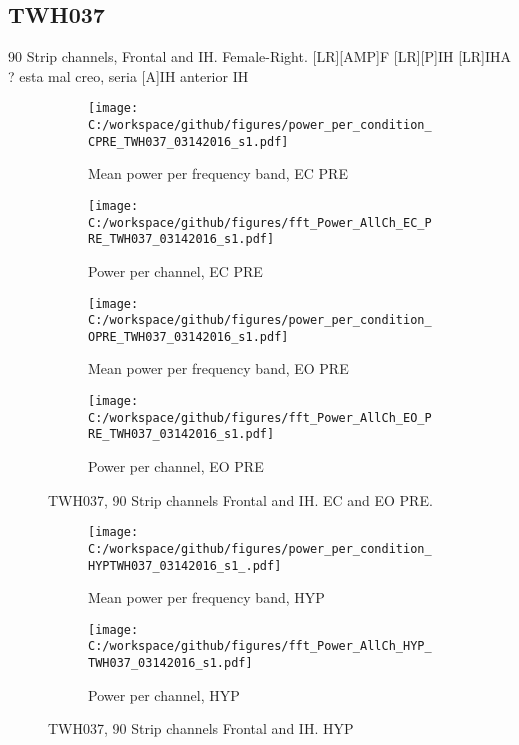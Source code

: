 \documentclass[11pt, onecolumn]{article}
\begin{document}
{\subsection{TWH037}
90 Strip channels, Frontal and IH. Female-Right.
[LR][AMP]F
[LR][P]IH
[LR]IHA  ? esta mal creo, seria [A]IH anterior IH
\begin{figure}[t!] %
\begin{subfigure}{0.48\textwidth}
\texttt{[image: C:/workspace/github/figures/power\_per\_condition\_CPRE\_TWH037\_03142016\_s1.pdf]}
\caption{Mean power per frequency band, EC PRE} \label{fig:a}
\end{subfigure}\hspace*{\fill}
\begin{subfigure}{0.48\textwidth}
\texttt{[image: C:/workspace/github/figures/fft\_Power\_AllCh\_EC\_PRE\_TWH037\_03142016\_s1.pdf]}
\caption{Power per channel, EC PRE} \label{fig:b}
\end{subfigure}

\medskip
\begin{subfigure}{0.48\textwidth}
\texttt{[image: C:/workspace/github/figures/power\_per\_condition\_OPRE\_TWH037\_03142016\_s1.pdf]}
\caption{Mean power per frequency band, EO PRE} \label{fig:a}
\end{subfigure}\hspace*{\fill}
\begin{subfigure}{0.48\textwidth}
\texttt{[image: C:/workspace/github/figures/fft\_Power\_AllCh\_EO\_PRE\_TWH037\_03142016\_s1.pdf]}
\caption{Power per channel, EO PRE} \label{fig:b}
\end{subfigure}
\caption{TWH037, 
90 Strip channels  Frontal and IH. EC and EO PRE.} \label{fig:37PRE}
\end{figure}



\begin{figure}[t!] %
\begin{subfigure}{0.48\textwidth}
\texttt{[image: C:/workspace/github/figures/power\_per\_condition\_HYPTWH037\_03142016\_s1\_.pdf]}
\caption{Mean power per frequency band, HYP} \label{fig:a}
\end{subfigure}\hspace*{\fill}
\begin{subfigure}{0.48\textwidth}
\texttt{[image: C:/workspace/github/figures/fft\_Power\_AllCh\_HYP\_TWH037\_03142016\_s1.pdf]}
\caption{Power per channel, HYP} \label{fig:b}
\end{subfigure}
\caption{TWH037, 90 Strip channels  Frontal and IH. HYP} \label{fig:37HYP}
\end{figure}


}
\end{document}
